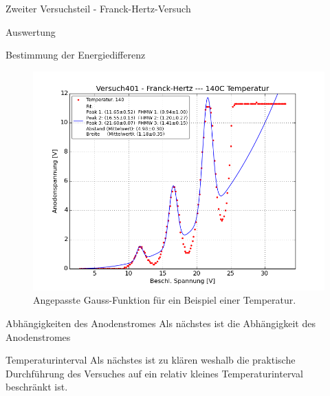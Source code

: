 \documentclass[pdftex, a4paper,11pt, twoside, ngerman]{report}
\begin{document}
\begin{chapter}{Zweiter Versuchsteil - Franck-Hertz-Versuch}
\begin{section}{Auswertung}
\begin{subsection}{Bestimmung der Energiedifferenz}
\begin{figure}[ht]
\begin{minipage}{0.48\textwidth}
            \includegraphics[width=\textwidth]
                {Figures/Versuch401-Franck-Hertz-140CTemperatur_Beschl_Spannung_Anodenspannung.png}
            \caption{Angepasste Gauss-Funktion für ein Beispiel einer
                Temperatur.}
            \label{fig:FHT140C}
          \end{minipage}
        \end{figure}
        
      \end{subsection}
      
      
      
      \begin{subsection}{Abhängigkeiten des Anodenstromes}
        \label{chp:FH:sec:AuswertungAnodenstrom}
        Als nächstes ist die Abhängigkeit des Anodenstromes 
      \end{subsection}
      
      
      
      \begin{subsection}{Temperaturinterval}
        \label{chp:FH:sec:AuswertungTemperatur}
        Als nächstes ist zu klären weshalb die praktische Durchführung des
        Versuches auf ein relativ kleines Temperaturinterval beschränkt ist.
      \end{subsection}
      

\end{section}
\end{chapter}
\end{document}
